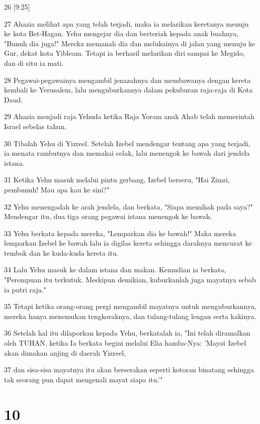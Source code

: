 \par 26 [9:25]
\par 27 Ahazia melihat apa yang telah terjadi, maka ia melarikan keretanya menuju ke kota Bet-Hagan. Yehu mengejar dia dan berteriak kepada anak buahnya, "Bunuh dia juga!" Mereka memanah dia dan melukainya di jalan yang menuju ke Gur, dekat kota Yibleam. Tetapi ia berhasil melarikan diri sampai ke Megido, dan di situ ia mati.
\par 28 Pegawai-pegawainya mengambil jenazahnya dan membawanya dengan kereta kembali ke Yerusalem, lalu menguburkannya dalam pekuburan raja-raja di Kota Daud.
\par 29 Ahazia menjadi raja Yehuda ketika Raja Yoram anak Ahab telah memerintah Israel sebelas tahun.
\par 30 Tibalah Yehu di Yizreel. Setelah Izebel mendengar tentang apa yang terjadi, ia menata rambutnya dan memakai celak, lalu menengok ke bawah dari jendela istana.
\par 31 Ketika Yehu masuk melalui pintu gerbang, Izebel berseru, "Hai Zimri, pembunuh! Mau apa kau ke sini?"
\par 32 Yehu menengadah ke arah jendela, dan berkata, "Siapa memihak pada saya?" Mendengar itu, dua tiga orang pegawai istana menengok ke bawah.
\par 33 Yehu berkata kepada mereka, "Lemparkan dia ke bawah!" Maka mereka lemparkan Izebel ke bawah lalu ia digilas kereta sehingga darahnya mencurat ke tembok dan ke kuda-kuda kereta itu.
\par 34 Lalu Yehu masuk ke dalam istana dan makan. Kemudian ia berkata, "Perempuan itu terkutuk. Meskipun demikian, kuburkanlah juga mayatnya sebab ia putri raja."
\par 35 Tetapi ketika orang-orang pergi mengambil mayatnya untuk menguburkannya, mereka hanya menemukan tengkoraknya, dan tulang-tulang lengan serta kakinya.
\par 36 Setelah hal itu dilaporkan kepada Yehu, berkatalah ia, "Ini telah diramalkan oleh TUHAN, ketika Ia berkata begini melalui Elia hamba-Nya: 'Mayat Izebel akan dimakan anjing di daerah Yizreel,
\par 37 dan sisa-sisa mayatnya itu akan berserakan seperti kotoran binatang sehingga tak seorang pun dapat mengenali mayat siapa itu.'"

\chapter{10}

